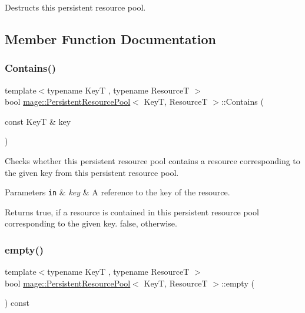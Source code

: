 Destructs this persistent resource pool. 

\subsection{Member Function Documentation}
\mbox{\label{classmage_1_1_persistent_resource_pool_a92af0c4a200ea217b831d89cfc321557}} 
\subsubsection{\texorpdfstring{Contains()}{Contains()}}
{\footnotesize\ttfamily template$<$typename KeyT , typename ResourceT $>$ \\
bool \mbox{\hyperlink{classmage_1_1_persistent_resource_pool}{mage\+::\+Persistent\+Resource\+Pool}}$<$ KeyT, ResourceT $>$\+::Contains (\begin{DoxyParamCaption}\item[{const KeyT \&}]{key }\end{DoxyParamCaption})\hspace{0.3cm}{\ttfamily [noexcept]}}

Checks whether this persistent resource pool contains a resource corresponding to the given key from this persistent resource pool.


\begin{DoxyParams}[1]{Parameters}
\mbox{\tt in}  & {\em key} & A reference to the key of the resource. \\
\hline
\end{DoxyParams}
\begin{DoxyReturn}{Returns}
{\ttfamily true}, if a resource is contained in this persistent resource pool corresponding to the given key. {\ttfamily false}, otherwise. 
\end{DoxyReturn}
\mbox{\label{classmage_1_1_persistent_resource_pool_a9a5669551c15823b817b3c4716a5a52c}} 
\subsubsection{\texorpdfstring{empty()}{empty()}}
{\footnotesize\ttfamily template$<$typename KeyT , typename ResourceT $>$ \\
bool \mbox{\hyperlink{classmage_1_1_persistent_resource_pool}{mage\+::\+Persistent\+Resource\+Pool}}$<$ KeyT, ResourceT $>$\+::empty (\begin{DoxyParamCaption}{ }\end{DoxyParamCaption}) const\hspace{0.3cm}{\ttfamily [noexcept]}}

